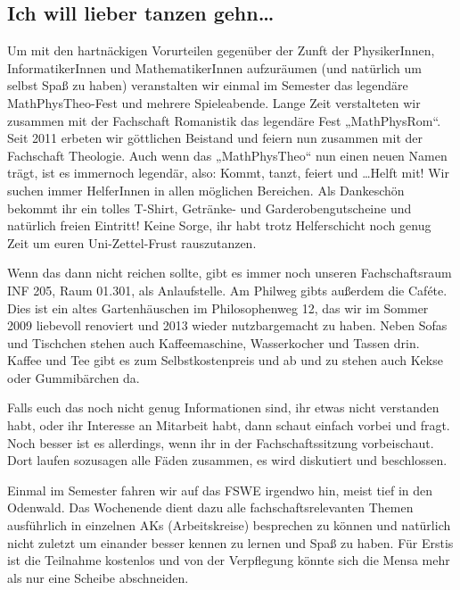\subsection*{Ich will lieber tanzen gehn\dots}
Um mit den hartnäckigen Vorurteilen gegenüber der Zunft der PhysikerInnen,
InformatikerInnen und MathematikerInnen aufzuräumen (und natürlich um selbst
Spaß zu haben) veranstalten wir einmal im Semester das legendäre
MathPhysTheo-Fest und  mehrere Spieleabende.  Lange Zeit verstalteten wir
zusammen mit der Fachschaft Romanistik das legendäre Fest „MathPhysRom“. Seit
2011 erbeten wir göttlichen Beistand und feiern nun zusammen mit der Fachschaft
Theologie. Auch wenn das „MathPhysTheo“ nun einen neuen Namen trägt, ist es
immernoch legendär, also: Kommt, tanzt, feiert und \dots Helft mit! Wir suchen
immer HelferInnen in allen möglichen Bereichen. Als Dankeschön bekommt ihr ein
tolles T-Shirt, Getränke- und Garderobengutscheine und natürlich freien
Eintritt! Keine Sorge, ihr habt trotz Helferschicht noch genug Zeit um euren
Uni-Zettel-Frust rauszutanzen.

Wenn das dann nicht reichen sollte, gibt es immer noch unseren Fachschaftsraum
INF 205, Raum 01.301, als Anlaufstelle.  Am Philweg gibts außerdem die Caféte.
Dies ist ein altes Gartenhäuschen im Philosophenweg 12, das wir im Sommer 2009
liebevoll renoviert und 2013 wieder nutzbargemacht zu haben. Neben Sofas und
Tischchen stehen auch Kaffeemaschine, Wasserkocher und Tassen drin. Kaffee und
Tee gibt es zum Selbstkostenpreis und ab und zu stehen auch Kekse oder
Gummibärchen da.

Falls euch das noch nicht genug Informationen sind, ihr etwas nicht verstanden
habt, oder ihr Interesse an Mitarbeit habt, dann schaut einfach vorbei und
fragt. Noch besser ist es allerdings, wenn ihr in der Fachschaftssitzung
vorbeischaut. Dort laufen sozusagen alle Fäden zusammen, es wird diskutiert und
beschlossen.

Einmal im Semester fahren wir auf das \gls{FSWE} irgendwo hin, meist tief in
den Odenwald. Das Wochenende dient dazu alle fachschaftsrelevanten Themen
ausführlich in einzelnen AKs (Arbeitskreise) besprechen zu können und natürlich
nicht zuletzt um einander besser kennen zu lernen und Spaß zu haben. Für Erstis
ist die Teilnahme kostenlos und von der Verpflegung könnte sich die Mensa mehr
als nur eine Scheibe abschneiden.

